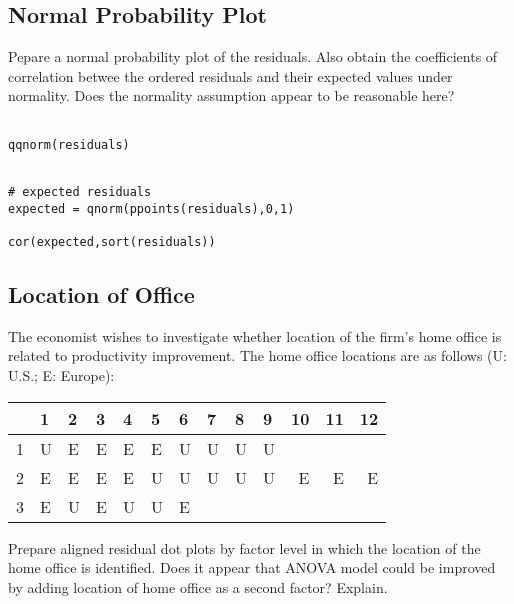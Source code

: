 \documentclass[11pt]{article}
\begin{document}
\subsection{Normal Probability Plot}
\label{sec-1-2}

Pepare a normal probability plot of the residuals.  Also obtain the
coefficients of correlation betwee the ordered residuals and their
expected values under normality.  Does the normality assumption
appear to be reasonable here?

\begin{verbatim}

qqnorm(residuals)
\end{verbatim}




\begin{verbatim}

# expected residuals
expected = qnorm(ppoints(residuals),0,1)

cor(expected,sort(residuals))
\end{verbatim}
\subsection{Location of Office}
\label{sec-1-3}

The economist wishes to investigate whether location of the firm's
home office is related to productivity improvement.  The home office
locations are as follows (U: U.S.; E: Europe):

\begin{center}
\begin{tabular}{rlllllllllrrr}
\hline
    &  1  &  2  &  3  &  4  &  5  &  6  &  7  &  8  &  9  &  10  &  11  &  12  \\
\hline
 1  &  U  &  E  &  E  &  E  &  E  &  U  &  U  &  U  &  U  &      &      &      \\
 2  &  E  &  E  &  E  &  E  &  U  &  U  &  U  &  U  &  U  &   E  &   E  &   E  \\
 3  &  E  &  U  &  E  &  U  &  U  &  E  &     &     &     &      &      &      \\
\hline
\end{tabular}
\end{center}



Prepare aligned residual dot plots by factor level in which the
location of the home office is identified.  Does it appear that ANOVA
model could be improved by adding location of home office as a second
factor?  Explain.
\end{document}
